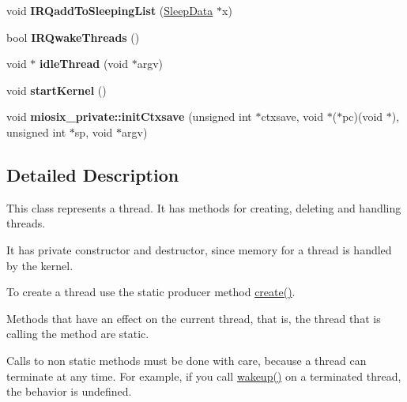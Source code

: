 \begin{DoxyCompactItemize}
\item 
\hypertarget{classmiosix_1_1_thread_a40d27a24e1981da39a7e3c2535a65100}{void {\bfseries I\-R\-Qadd\-To\-Sleeping\-List} (\hyperlink{structmiosix_1_1_sleep_data}{Sleep\-Data} $\ast$x)}\label{classmiosix_1_1_thread_a40d27a24e1981da39a7e3c2535a65100}

\item 
\hypertarget{classmiosix_1_1_thread_a198c0ce2b2ee1f076fae416f22100614}{bool {\bfseries I\-R\-Qwake\-Threads} ()}\label{classmiosix_1_1_thread_a198c0ce2b2ee1f076fae416f22100614}

\item 
\hypertarget{classmiosix_1_1_thread_a3d9b5cd3ae98fecda0f20b1d15049cad}{void $\ast$ {\bfseries idle\-Thread} (void $\ast$argv)}\label{classmiosix_1_1_thread_a3d9b5cd3ae98fecda0f20b1d15049cad}

\item 
\hypertarget{classmiosix_1_1_thread_a2553567e64baf56df9a20ce1b777acf4}{void {\bfseries start\-Kernel} ()}\label{classmiosix_1_1_thread_a2553567e64baf56df9a20ce1b777acf4}

\item 
\hypertarget{classmiosix_1_1_thread_a6682370c85e8fb1787a85388e91221f6}{void {\bfseries miosix\-\_\-private\-::init\-Ctxsave} (unsigned int $\ast$ctxsave, void $\ast$($\ast$pc)(void $\ast$), unsigned int $\ast$sp, void $\ast$argv)}\label{classmiosix_1_1_thread_a6682370c85e8fb1787a85388e91221f6}

\end{DoxyCompactItemize}


\subsection{Detailed Description}
This class represents a thread. It has methods for creating, deleting and handling threads.\par
It has private constructor and destructor, since memory for a thread is handled by the kernel.\par
To create a thread use the static producer method \hyperlink{classmiosix_1_1_thread_ac5a454f2617a4a28f00842b1097fc363}{create()}.\par
 Methods that have an effect on the current thread, that is, the thread that is calling the method are static.\par
 Calls to non static methods must be done with care, because a thread can terminate at any time. For example, if you call \hyperlink{classmiosix_1_1_thread_af19b8a2ab852ea771a2e2b95bb0ba2a8}{wakeup()} on a terminated thread, the behavior is undefined. 

